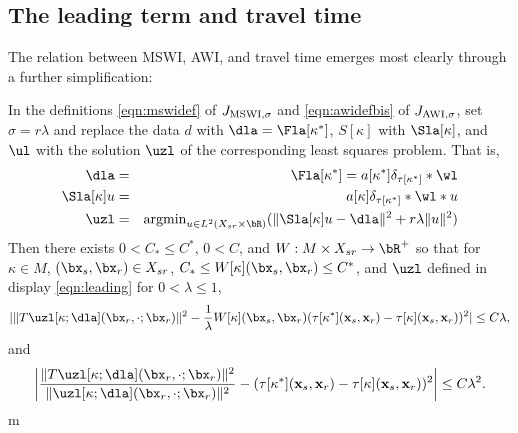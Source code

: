 \subsection{The leading term and travel time}

The relation between MSWI, AWI, and travel time emerges most clearly
through a further simplification:

\begin{prop}
  \label{thm:leading}
In the definitions \ref{eqn:mswidef} of $J_{\rm MSWI,\sigma}$ and
\ref{eqn:awidefbis} of $J_{\rm AWI,\sigma}$, set $\sigma = r\lambda$
and replace the data $d$ with
$\dla = \Fla[\kappa^*]$, $S[\kappa]$ with $\Sla[\kappa]$, and $\ul$
with the solution $\uzl$ of the corresponding least squares problem. That is,
\begin{eqnarray}
  \label{eqn:leading}
  \dla & = & \Fla[\kappa^*] = a[\kappa^*]\delta_{\tau[\kappa^*]}*\wl
             \nonumber \\
  \Sla[\kappa]u &=& a[\kappa]\delta_{\tau[\kappa^*]}*\wl *u\nonumber
  \\
  \uzl &=& \mbox{argmin}_{u \in L^2(X_{sr} \times \bR)} (\|\Sla[\kappa]u-\dla\|^2 + r\lambda\|u\|^2)
\end{eqnarray}
Then there exists $0 < C_* \le C^*$, $0 < C$, and $W: M \times X_{sr}
\rightarrow \bR^+$ so that for
$\kappa \in M$, $(\bx_s,\bx_r) \in X_{sr}$, $C_* \le
W[\kappa](\bx_s,\bx_r) \le C^*$, and $\uzl$ defined in display
\ref{eqn:leading} for $0 < \lambda \le 1$, 
\begin{equation}
  \label{eqn:mswittz}
 | \|T\uzl[\kappa;\dla] (\bx_r,\cdot;\bx_r)\|^2- 
  \frac{1}{\lambda} W[\kappa](\bx_s,\bx_r) (\tau[\kappa^*]({\bf
  x}_s,{\bf x}_r)-\tau[\kappa]({\bf x}_s,{\bf x}_r))^2 | \le C\lambda,
\end{equation}
and
\begin{equation}
  \label{eqn:awittz}
  \left| \frac{\|T\uzl[\kappa;\dla] (\bx_r,\cdot;\bx_r)\|^2}{
        \|\uzl[\kappa;\dla] (\bx_r,\cdot;\bx_r)\|^2} - (\tau[\kappa^*]({\bf
  x}_s,{\bf x}_r)-\tau[\kappa]({\bf x}_s,{\bf x}_r))^2\right|  \le C\lambda^2.
\end{equation}
m\end{prop}

